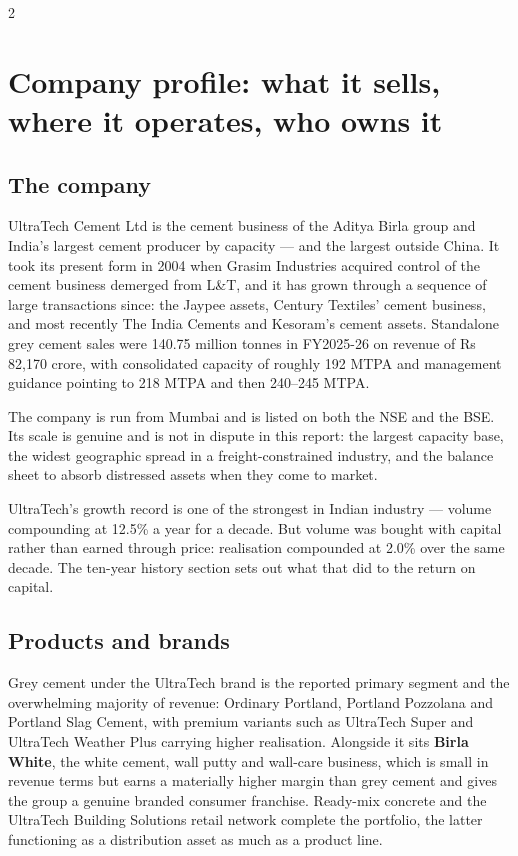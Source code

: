 \begin{paracol}{2}
\switchcolumn*
\section{Company profile: what it sells, where it operates, who owns it}

\subsection{The company}

UltraTech Cement Ltd is the cement business of the Aditya Birla group and India's
largest cement producer by capacity — and the largest outside China. It took its
present form in 2004 when Grasim Industries acquired control of the cement business
demerged from L\&T, and it has grown through a sequence of large transactions since:
the Jaypee assets, Century Textiles' cement business, and most recently The India
Cements and Kesoram's cement assets. Standalone grey cement sales were 140.75 million
tonnes in FY2025-26 on revenue of Rs 82,170 crore, with consolidated capacity of
roughly 192 MTPA and management guidance pointing to 218 MTPA and then 240--245 MTPA.

The company is run from Mumbai and is listed on both the NSE and the BSE. Its scale is
genuine and is not in dispute in this report: the largest capacity base, the widest
geographic spread in a freight-constrained industry, and the balance sheet to absorb
distressed assets when they come to market.

\begin{keybox}
UltraTech's growth record is one of the strongest in Indian industry — volume
compounding at 12.5\% a year for a decade. But volume was bought with capital rather
than earned through price: realisation compounded at 2.0\% over the same decade.
The ten-year history section sets out what that did to the return on capital.
\end{keybox}

\subsection{Products and brands}

Grey cement under the UltraTech brand is the reported primary segment and the
overwhelming majority of revenue: Ordinary Portland, Portland Pozzolana and Portland
Slag Cement, with premium variants such as UltraTech Super and UltraTech Weather Plus
carrying higher realisation. Alongside it sits \textbf{Birla White}, the white cement,
wall putty and wall-care business, which is small in revenue terms but earns a
materially higher margin than grey cement and gives the group a genuine branded
consumer franchise. Ready-mix concrete and the UltraTech Building Solutions retail
network complete the portfolio, the latter functioning as a distribution asset as much
as a product line.


\end{paracol}
